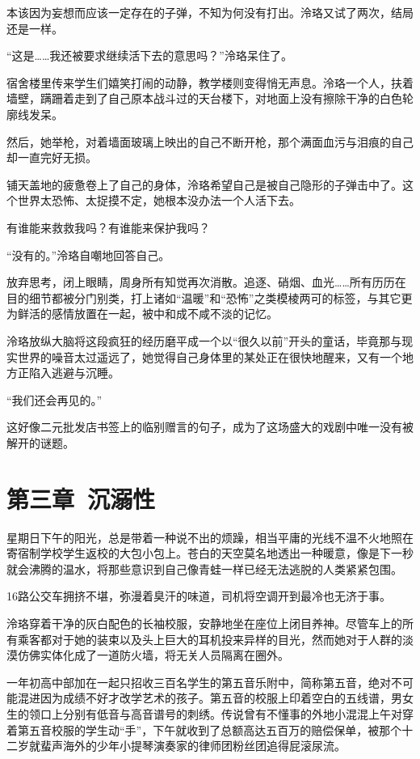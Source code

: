 \documentclass[UTF8, scheme = chinese, openany]{ctexbook}
\begin{document}
本该因为妄想而应该一定存在的子弹，不知为何没有打出。泠珞又试了两次，结局还是一样。

“这是……我还被要求继续活下去的意思吗？”泠珞呆住了。

宿舍楼里传来学生们嬉笑打闹的动静，教学楼则变得悄无声息。泠珞一个人，扶着墙壁，蹒跚着走到了自己原本战斗过的天台楼下，对地面上没有擦除干净的白色轮廓线发呆。

然后，她举枪，对着墙面玻璃上映出的自己不断开枪，那个满面血污与泪痕的自己却一直完好无损。

铺天盖地的疲惫卷上了自己的身体，泠珞希望自己是被自己隐形的子弹击中了。这个世界太恐怖、太捉摸不定，她根本没办法一个人活下去。

有谁能来救救我吗？有谁能来保护我吗？

“没有的。”泠珞自嘲地回答自己。

放弃思考，闭上眼睛，周身所有知觉再次消散。追逐、硝烟、血光……所有历历在目的细节都被分门别类，打上诸如“温暖”和“恐怖”之类模棱两可的标签，与其它更为鲜活的感情放置在一起，被中和成不咸不淡的记忆。

泠珞放纵大脑将这段疯狂的经历磨平成一个以“很久以前”开头的童话，毕竟那与现实世界的噪音太过遥远了，她觉得自己身体里的某处正在很快地醒来，又有一个地方正陷入逃避与沉睡。

“我们还会再见的。”

这好像二元批发店书签上的临别赠言的句子，成为了这场盛大的戏剧中唯一没有被解开的谜题。

\chapter{第三章\ 沉溺性}

星期日下午的阳光，总是带着一种说不出的烦躁，相当平庸的光线不温不火地照在寄宿制学校学生返校的大包小包上。苍白的天空莫名地透出一种暖意，像是下一秒就会沸腾的温水，将那些意识到自己像青蛙一样已经无法逃脱的人类紧紧包围。

16路公交车拥挤不堪，弥漫着臭汗的味道，司机将空调开到最冷也无济于事。

泠珞穿着干净的灰白配色的长袖校服，安静地坐在座位上闭目养神。尽管车上的所有乘客都对于她的装束以及头上巨大的耳机投来异样的目光，然而她对于人群的淡漠仿佛实体化成了一道防火墙，将无关人员隔离在圈外。

一年初高中部加在一起只招收三百名学生的第五音乐附中，简称第五音，绝对不可能混进因为成绩不好才改学艺术的孩子。第五音的校服上印着空白的五线谱，男女生的领口上分别有低音与高音谱号的刺绣。传说曾有不懂事的外地小混混上午对穿着第五音校服的学生动“手”，下午就收到了总额高达五百万的赔偿保单，被那个十二岁就蜚声海外的少年小提琴演奏家的律师团粉丝团追得屁滚尿流。
\end{document}
